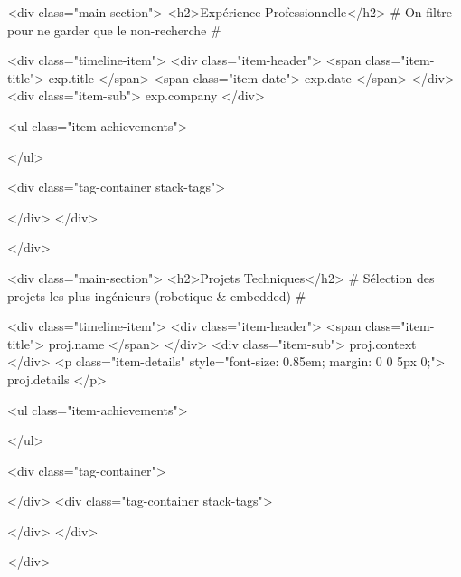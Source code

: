 {{{{{{{{{{{{{            <div class="main-section">
                <h2>Expérience Professionnelle</h2>
                {# On filtre pour ne garder que le non-recherche #}
                {%
                {%
                <div class="timeline-item">
                    <div class="item-header">
                        <span class="item-title">{{ exp.title }}</span>
                        <span class="item-date">{{ exp.date }}</span>
                    </div>
                    <div class="item-sub">{{ exp.company }}</div>
                    {%
                    <ul class="item-achievements">
                        {%
                    </ul>
                    {%
                    <div class="tag-container stack-tags">
                        {%
                    </div>
                </div>
                {%
                {%
            </div>

            <div class="main-section">
                <h2>Projets Techniques</h2>
                {# Sélection des projets les plus ingénieurs (robotique & embedded) #}
                {%
                {%
                {%

                {%
                <div class="timeline-item">
                    <div class="item-header">
                        <span class="item-title">{{ proj.name }}</span>
                    </div>
                    <div class="item-sub">{{ proj.context }}</div>
                    <p class="item-details" style="font-size: 0.85em; margin: 0 0 5px 0;">{{ proj.details }}</p>
                    {%
                    <ul class="item-achievements">
                        {%
                    </ul>
                    {%
                    <div class="tag-container">
                        {%
                    </div>
                    <div class="tag-container stack-tags">
                        {%
                    </div>
                </div>
                {%
            </div>

}}}}}}}}}}}}}}}}}}}}}}}}}}}}}}}

